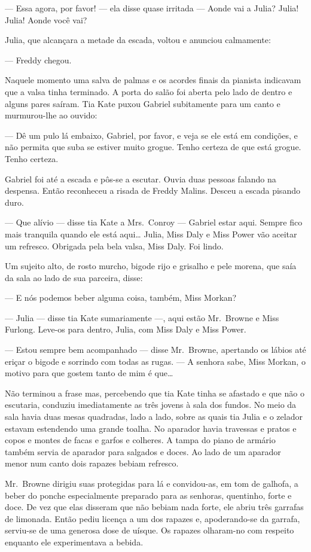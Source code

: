 --- Essa agora, por favor! --- ela disse quase irritada --- Aonde vai a Julia?
Julia!  Julia!  Aonde você vai?

Julia, que alcançara a metade da escada, voltou e anunciou calmamente:

--- Freddy chegou.

Naquele momento uma salva de palmas e os acordes finais da pianista indicavam
que a valsa tinha terminado.  A porta do salão foi aberta pelo lado de dentro e
alguns pares saíram.  Tia Kate puxou Gabriel subitamente para um canto e
murmurou-lhe ao ouvido:

--- Dê um pulo lá embaixo, Gabriel, por favor, e veja se ele está em condições,
e não permita que suba se estiver muito grogue.  Tenho certeza de que está grogue.  Tenho
certeza.

Gabriel foi até a escada e pôs-se a escutar.  Ouvia duas pessoas falando na
despensa.  Então reconheceu a risada de Freddy Malins.  Desceu a escada pisando
duro.

--- Que alívio --- disse tia Kate a Mrs.~Conroy --- Gabriel estar aqui.  Sempre
fico mais tranquila quando ele está aqui\ldots{}  Julia, Miss Daly e Miss Power
vão aceitar um refresco.  Obrigada pela bela valsa, Miss Daly.  Foi lindo.

Um sujeito alto, de rosto murcho, bigode rijo e grisalho e pele morena, que
saía da sala ao lado de sua parceira, disse:

--- E nós podemos beber alguma coisa, também, Miss Morkan?

--- Julia --- disse tia Kate sumariamente ---, aqui estão Mr.~Browne e Miss
Furlong.  Leve-os para dentro, Julia, com Miss Daly e Miss Power.

--- Estou sempre bem acompanhado --- disse Mr.~Browne, apertando os lábios até
eriçar o bigode e sorrindo com todas as rugas.  --- A senhora sabe, Miss
Morkan, o motivo para que gostem tanto de mim é que\ldots{}

Não terminou a frase mas, percebendo que tia Kate tinha se afastado e que não o
escutaria, conduziu imediatamente as três jovens à sala dos fundos.  No meio da
sala havia duas mesas quadradas, lado a lado, sobre as quais tia Julia e o
zelador estavam estendendo uma grande toalha.  No aparador havia travessas e
pratos e copos e montes de facas e garfos e colheres.  A tampa do piano de
armário também servia de aparador para salgados e doces.  Ao lado de um
aparador menor num canto dois rapazes bebiam refresco.

Mr.~Browne dirigiu suas protegidas para lá e convidou-as, em tom de galhofa, a
beber do ponche especialmente preparado para as senhoras, quentinho, forte e
doce.  De vez que elas disseram que não bebiam nada forte, ele abriu três
garrafas de limonada.  Então pediu licença a um dos rapazes e, apoderando-se da
garrafa, serviu-se de uma generosa dose de uísque.  Os rapazes olharam-no com
respeito enquanto ele experimentava a bebida.

